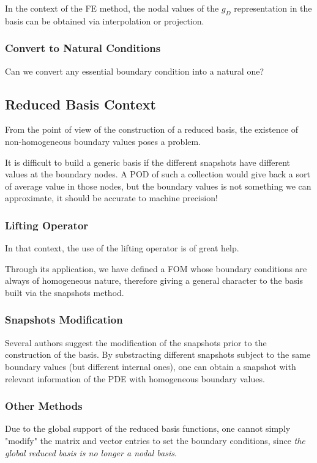\documentclass[../main.tex]{subfiles}
\begin{document}
In the context of the FE method, the nodal values of the $g_D$ representation in the basis can be obtained via interpolation or projection. 

\subsubsection{Convert to Natural Conditions}
Can we convert any essential boundary condition into a natural one?


\subsection{Reduced Basis Context}
From the point of view of the construction of a reduced basis, the existence of non-homogeneous boundary values poses a problem.

It is difficult to build a generic basis if the different snapshots have different values at the boundary nodes. 
A POD of such a collection would give back a sort of average value in those nodes, but the boundary values is not something we can approximate, it should be accurate to machine precision!

\subsubsection{Lifting Operator}
In that context, the use of the lifting operator is of great help. 

Through its application, we have defined a FOM whose boundary conditions are always of homogeneous nature, therefore giving a general character to the basis built via the snapshots method.

\subsubsection{Snapshots Modification}
Several authors suggest the modification of the snapshots prior to the construction of the basis.
By substracting different snapshots subject to the same boundary values (but different internal ones), one can obtain a snapshot with relevant information of the PDE with homogeneous boundary values. 

\subsubsection{Other Methods}
Due to the global support of the reduced basis functions, one cannot simply "modify" the matrix and vector entries to set the boundary conditions, since \textit{the global reduced basis is no longer a nodal basis}.
\end{document}
